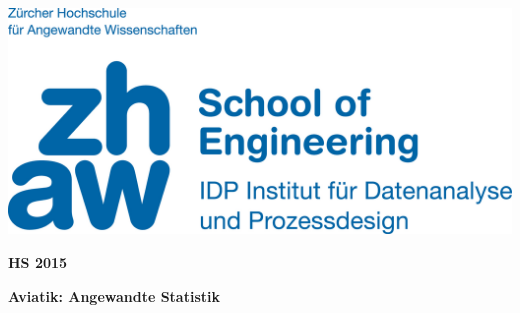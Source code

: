 \noindent
\begin{minipage}[t]{0.4\textwidth} 
\includegraphics[width=\linewidth]{logo.jpg}
\end{minipage}%
\hfill%
\begin{minipage}[t]{0.4\textwidth}\raggedleft
\textbf{\large HS 2015}
\end{minipage}

\begin{center}
 \textbf{\large Aviatik: Angewandte Statistik} \\
 \vspace{0.3cm}
\end{center}
